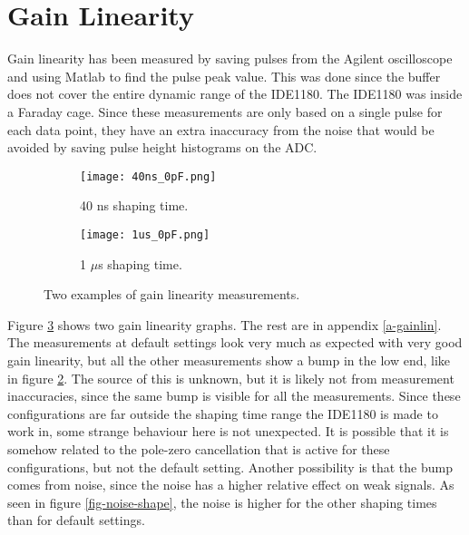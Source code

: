 \documentclass[../main/thesis.tex]{subfiles}
\begin{document}



\section{Gain Linearity}
\label{ide-linearity}

Gain linearity has been measured by saving pulses from the Agilent oscilloscope and using Matlab to find the pulse peak value. This was done since the buffer does not cover the entire dynamic range of the IDE1180. The IDE1180 was inside a Faraday cage. Since these measurements are only based on a single pulse for each data point, they have an extra inaccuracy from the noise that would be avoided by saving pulse height histograms on the ADC. 

\begin{figure} [h]%
	\centering
	\begin{subfigure}{.5\textwidth}
		\centering
		\texttt{[image: 40ns\_0pF.png]}
		\caption{40 ns shaping time.}
		\label{fig-gainlin-40n}
	\end{subfigure}%
	\begin{subfigure}{.5\textwidth}
		\centering
		\texttt{[image: 1us\_0pF.png]}
		\caption{1 $\mu$s shaping time.}
		\label{fig-gainlin-1u} 
	\end{subfigure}
	\caption{Two examples of gain linearity measurements.}
	\label{fig-gainlin}
\end{figure}

Figure \ref{fig-gainlin} shows two gain linearity graphs. The rest are in appendix \ref{a-gainlin}. The measurements at default settings look very much as expected with very good gain linearity, but all the other measurements show a bump in the low end, like in figure \ref{fig-gainlin-1u}. The source of this is unknown, but it is likely not from measurement inaccuracies, since the same bump is visible for all the measurements. Since these configurations are far outside the shaping time range the IDE1180 is made to work in, some strange behaviour here is not unexpected. It is possible that it is somehow related to the pole-zero cancellation that is active for these configurations, but not the default setting. Another possibility is that the bump comes from noise, since the noise has a higher relative effect on weak signals. As seen in figure \ref{fig-noise-shape}, the noise is higher for the other shaping times than for default settings. 
\end{document}
